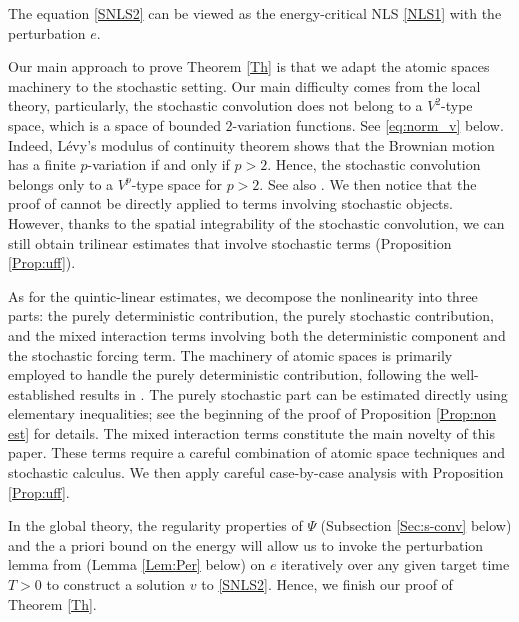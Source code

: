 \documentclass[letterpaper, 11pt,  reqno]{amsart}
\newcommand{\1}{\hspace{0.5mm}\text{I}\hspace{0.5mm}}
\newcommand{\noi}{\noindent}
\numberwithin{equation}{section}
\numberwithin{theorem}{section}
\begin{document}
\noi
The equation \eqref{SNLS2} can be viewed as the energy-critical NLS \eqref{NLS1} with the perturbation $e$. 






Our main approach to prove Theorem \ref{Th} is that we adapt the atomic spaces machinery to the stochastic setting.
Our  main difficulty comes from the local theory, particularly,
the stochastic convolution does not belong to a $V^2$-type space,
which is a space of bounded $2$-variation functions.
See \eqref{eq:norm_v} below.
Indeed,
L\'evy's modulus of continuity theorem
shows that
the Brownian motion has a finite $p$-variation
if and only if $p >2$.
Hence, the stochastic convolution belongs only to a $V^p$-type space for $p>2$.
See also \cite{CO1}.
We then notice that the proof of \cite[Proposition 3.5]{HTT11} cannot be directly applied to terms involving stochastic objects.
However, thanks to the spatial integrability of the stochastic convolution,
we can still obtain trilinear estimates that involve  stochastic terms (Proposition \ref{Prop:uff}).

As for the quintic-linear estimates,
we decompose the nonlinearity into three parts: 
the purely deterministic contribution, the purely stochastic contribution, 
and the mixed interaction terms involving both the deterministic component and the stochastic forcing term.
The machinery of atomic spaces is primarily employed to handle the purely deterministic contribution, 
following the well-established results in \cite{HTT11, IP12}. 
The purely stochastic part can be estimated directly using elementary inequalities; 
see the beginning of the proof of Proposition \ref{Prop:non est} for details.
The mixed interaction terms constitute the main novelty of this paper. 
These terms require a careful combination of atomic space techniques and stochastic calculus. 
We then apply careful case-by-case analysis with Proposition \ref{Prop:uff}.


In the global theory,
the regularity properties of $\Psi$ (Subsection \ref{Sec:s-conv} below) 
and the a priori bound on the energy will allow us to invoke 
the perturbation lemma from \cite{IP12} (Lemma \ref{Lem:Per} below) 
on $e$ iteratively over any given target time $T>0$
 to construct a solution $v$ to \eqref{SNLS2}. Hence, we finish our proof of  Theorem \ref{Th}. 
\end{document}
